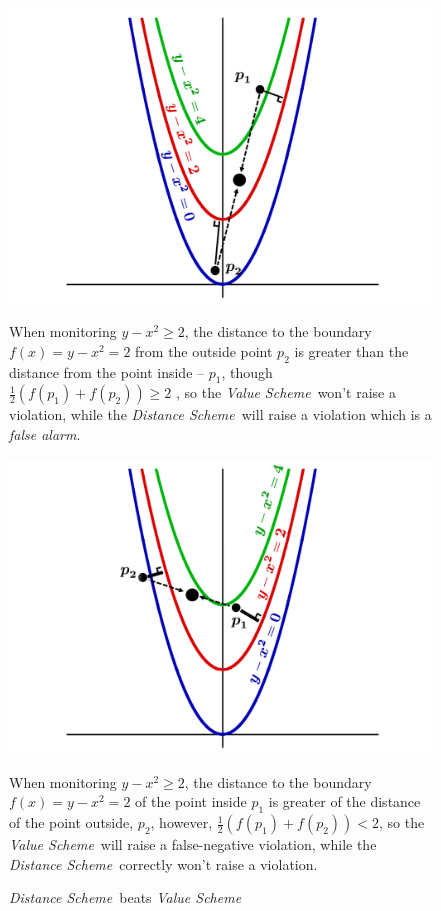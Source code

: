 \documentclass[10pt, conference]{IEEEtran}
\newcommand{\valueScheme}{\textit{Value Scheme}}
\newcommand{\distanceScheme}{\textit{Distance Scheme}}
\newcommand{\falseAlarm}{\textit{false alarm}}
\begin{document}
\begin{figure}[t]
\begin{minipage}[t]{0.49\linewidth}
{\centering
\includegraphics[width=\textwidth]{Pics/PNGs/ValueSchemeBetter.png}
\caption{\valueScheme \ beats \distanceScheme}
\label{fig:valueBeatsDistanceFigure}}
\medskip
\small
When monitoring ${y-x^2 \geq 2}$, the distance to the boundary ${f(x) = y - x^2 = 2}$ from the outside point $p_2$ is greater than the distance from the point inside -- $p_1$, though ${\frac{1}{2}(f(p_1)+f(p_2))\geq 2}$ , so the \valueScheme \ won't raise a violation, while the \distanceScheme \ will raise a violation which is a \falseAlarm .

\end{minipage}
\begin{minipage}[t]{0.02\linewidth}
\hfill
\end{minipage}
\begin{minipage}[t]{0.49\linewidth}
{\centering
\includegraphics[width=\textwidth]{Pics/PNGs/DistanceSchemeBetter.png}
\caption{\distanceScheme \ beats \valueScheme}
\label{fig:distanceBeatsValueFigure}}
\medskip
\small
When monitoring ${y-x^2 \geq 2}$, the distance to the boundary ${f(x) = y - x^2 = 2}$ of the point inside $p_1$ is greater of the distance of the point outside, $p_2$, however, ${\frac{1}{2}(f(p_1)+f(p_2))< 2}$, so the \valueScheme \ will raise a false-negative violation, while the \distanceScheme \ correctly won't raise a violation.
\end{minipage}
\end{figure}
\end{document}
